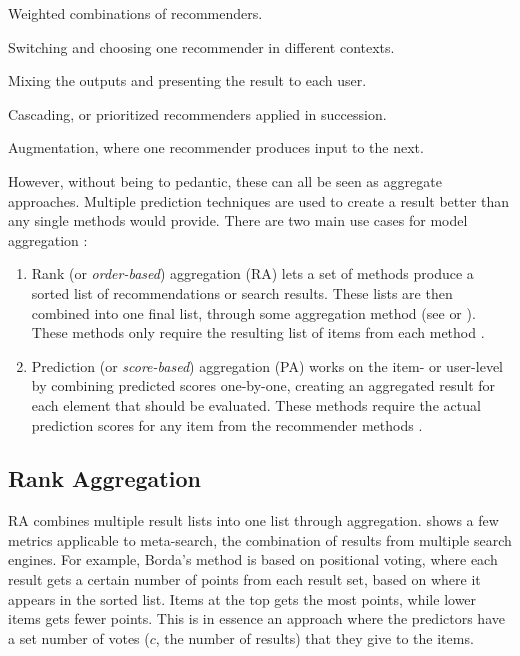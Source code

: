 \begin{itemize*}
  \item Weighted combinations of recommenders.
  \item Switching and choosing one recommender in different contexts.
  \item Mixing the outputs and presenting the result to each user.
  \item Cascading, or prioritized recommenders applied in succession.
  \item Augmentation, where one recommender produces input to the next.
\end{itemize*}

However, without being to pedantic, these can all be seen as aggregate approaches. Multiple prediction techniques are used
to create a result better than any single methods would provide.
There are two main use cases for model aggregation \cite{Liu2007}: 

\begin{enumerate}
  \item Rank (or \emph{order-based}) aggregation (RA) lets a set of methods
  produce a sorted list of recommendations or search results. These lists are then combined
  into one final list, through some aggregation method (see \cite{Dwork2001} or \cite{Klementiev2008}).
  These methods only require the resulting list of items from each method \cite{Aslam2001}.

  \item Prediction (or \emph{score-based}) aggregation (PA) works on the item- or user-level by combining predicted scores
  one-by-one, creating an aggregated result for each element that should be evaluated.
  These methods require the actual prediction scores for any item from the recommender methods \cite[p2]{Aslam2001}.
\end{enumerate}

\subsection{Rank Aggregation}
\label{sec:theory:rank}

RA combines multiple result lists into one list through aggregation.
\cite{Dwork2001} shows a few metrics applicable to meta-search, the combination of results from multiple search engines.
For example, Borda's method \cite[p6]{Dwork2001} is based on positional voting, where each result gets a certain number of points from each result set,
based on where it appears in the sorted list. Items at the top gets the most points, while lower items gets fewer points.
This is in essence an approach where the predictors have a set number of votes ($c$, the number of results) that they give to the items.

